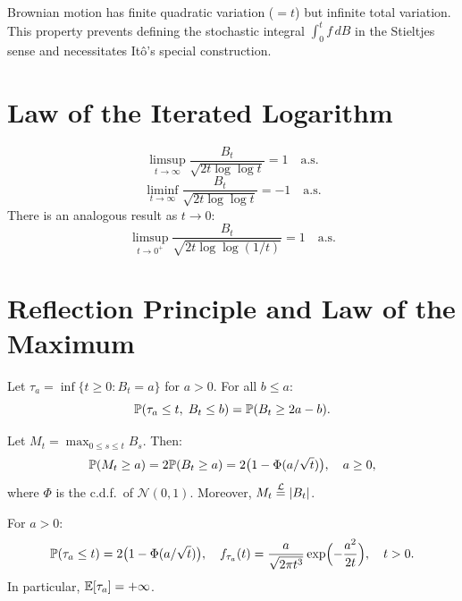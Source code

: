 \begin{warning}[title=\textbf{Finite Quadratic Variation, Infinite Total Variation}]
Brownian motion has finite quadratic variation ($= t$) but infinite total
variation. This property prevents defining the stochastic integral
$\int_0^t f \, dB$ in the Stieltjes sense and necessitates It\^o's special
construction.
\end{warning}

\section{Law of the Iterated Logarithm}

\begin{theorem}
\label{thm:LIL}
\[
  \limsup_{t \to \infty} \frac{B_t}{\sqrt{2t \log \log t}} = 1 \quad \text{a.s.}
\]
\[
  \liminf_{t \to \infty} \frac{B_t}{\sqrt{2t \log \log t}} = -1 \quad \text{a.s.}
\]
There is an analogous result as $t \to 0$:
\[
  \limsup_{t \to 0^+} \frac{B_t}{\sqrt{2t \log \log(1/t)}} = 1 \quad \text{a.s.}
\]
\end{theorem}

\section{Reflection Principle and Law of the Maximum}

\begin{theorem}
\label{thm:reflection}
Let $\tau_a = \inf\{t \geq 0 : B_t = a\}$ for $a > 0$. For all $b \leq a$:
\[
  \mathbb{P}(\tau_a \leq t,\; B_t \leq b) = \mathbb{P}(B_t \geq 2a - b).
\]
\end{theorem}

\begin{corollary}
\label{cor:law_max}
Let $M_t = \max_{0 \leq s \leq t} B_s$. Then:
\[
  \mathbb{P}(M_t \geq a) = 2\mathbb{P}(B_t \geq a) = 2\bigl(1 - \Phi(a/\sqrt{t})\bigr),
  \quad a \geq 0,
\]
where $\Phi$ is the c.d.f.\ of $\mathcal{N}(0,1)$. Moreover,
$M_t \overset{\mathcal{L}}{=} \left| B_t \right|$.
\end{corollary}

\begin{corollary}
For $a > 0$:
\[
  \mathbb{P}(\tau_a \leq t) = 2\bigl(1 - \Phi(a/\sqrt{t})\bigr), \quad
  f_{\tau_a}(t) = \frac{a}{\sqrt{2\pi t^3}} \exp\Bigl(-\frac{a^2}{2t}\Bigr),
  \quad t > 0.
\]
In particular, $\mathbb{E}[\tau_a] = +\infty$.
\end{corollary}

